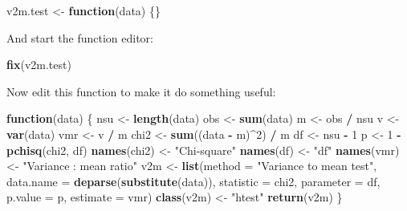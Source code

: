 \documentclass[12pt,a4paper]{book}
\newenvironment{Shaded}{\begin{snugshade}}{\end{snugshade}}
\newcommand{\ControlFlowTok}[1]{\textcolor[rgb]{0.13,0.29,0.53}{\textbf{#1}}}
\newcommand{\DataTypeTok}[1]{\textcolor[rgb]{0.13,0.29,0.53}{#1}}
\newcommand{\DecValTok}[1]{\textcolor[rgb]{0.00,0.00,0.81}{#1}}
\newcommand{\KeywordTok}[1]{\textcolor[rgb]{0.13,0.29,0.53}{\textbf{#1}}}
\newcommand{\NormalTok}[1]{#1}
\newcommand{\OperatorTok}[1]{\textcolor[rgb]{0.81,0.36,0.00}{\textbf{#1}}}
\newcommand{\StringTok}[1]{\textcolor[rgb]{0.31,0.60,0.02}{#1}}
\theoremstyle{definition}
\theoremstyle{definition}
\theoremstyle{definition}
\theoremstyle{remark}
\begin{document}
\begin{Shaded}
\begin{Highlighting}[]
\NormalTok{v2m.test <-}\StringTok{ }\ControlFlowTok{function}\NormalTok{(data) \{\}}
\end{Highlighting}
\end{Shaded}

And start the function editor:

\begin{Shaded}
\begin{Highlighting}[]
\KeywordTok{fix}\NormalTok{(v2m.test)}
\end{Highlighting}
\end{Shaded}

Now edit this function to make it do something useful:

\begin{Shaded}
\begin{Highlighting}[]
\ControlFlowTok{function}\NormalTok{(data) \{}
\NormalTok{  nsu <-}\StringTok{ }\KeywordTok{length}\NormalTok{(data)}
\NormalTok{  obs <-}\StringTok{ }\KeywordTok{sum}\NormalTok{(data)}
\NormalTok{  m <-}\StringTok{ }\NormalTok{obs }\OperatorTok{/}\StringTok{ }\NormalTok{nsu}
\NormalTok{  v <-}\StringTok{ }\KeywordTok{var}\NormalTok{(data)}
\NormalTok{  vmr <-}\StringTok{ }\NormalTok{v }\OperatorTok{/}\StringTok{ }\NormalTok{m}
\NormalTok{  chi2 <-}\StringTok{ }\KeywordTok{sum}\NormalTok{((data }\OperatorTok{-}\StringTok{ }\NormalTok{m)}\OperatorTok{^}\DecValTok{2}\NormalTok{) }\OperatorTok{/}\StringTok{ }\NormalTok{m}
\NormalTok{  df <-}\StringTok{ }\NormalTok{nsu }\OperatorTok{-}\StringTok{ }\DecValTok{1}
\NormalTok{  p <-}\StringTok{ }\DecValTok{1} \OperatorTok{-}\StringTok{ }\KeywordTok{pchisq}\NormalTok{(chi2, df)}
  \KeywordTok{names}\NormalTok{(chi2) <-}\StringTok{ "Chi-square"}
  \KeywordTok{names}\NormalTok{(df) <-}\StringTok{ "df"}
  \KeywordTok{names}\NormalTok{(vmr) <-}\StringTok{ "Variance : mean ratio"}
\NormalTok{  v2m <-}\StringTok{ }\KeywordTok{list}\NormalTok{(}\DataTypeTok{method =} \StringTok{"Variance to mean test"}\NormalTok{,}
              \DataTypeTok{data.name =} \KeywordTok{deparse}\NormalTok{(}\KeywordTok{substitute}\NormalTok{(data)),}
              \DataTypeTok{statistic =}\NormalTok{ chi2,}
              \DataTypeTok{parameter =}\NormalTok{ df,}
              \DataTypeTok{p.value =}\NormalTok{ p,}
              \DataTypeTok{estimate =}\NormalTok{ vmr)}
  \KeywordTok{class}\NormalTok{(v2m) <-}\StringTok{ "htest"}
  \KeywordTok{return}\NormalTok{(v2m)}
\NormalTok{\}}
\end{Highlighting}
\end{Shaded}
\end{document}
